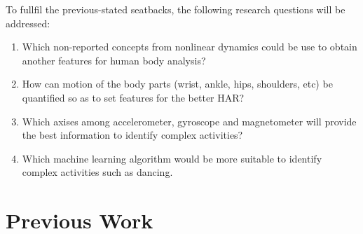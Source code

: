 \documentclass{sigchi}
\begin{document}
To fullfil the previous-stated seatbacks, the following research questions will be addressed:

\begin{enumerate}
  \setlength{\itemsep}{0pt}
  \setlength{\parsep}{0pt}
  \item Which non-reported concepts from nonlinear dynamics could be use to obtain 
	another features for human body analysis?
  \item How can motion of the body parts (wrist, ankle, hips, shoulders, etc)
        be quantified so as to set features for the better HAR?
  \item Which axises among accelerometer, gyroscope and magnetometer 
	will provide the best information to identify complex activities?
  \item Which machine learning algorithm would be more suitable to identify complex 
    activities such as dancing.
\end{enumerate}

% 


\section{Previous Work}
\end{document}
